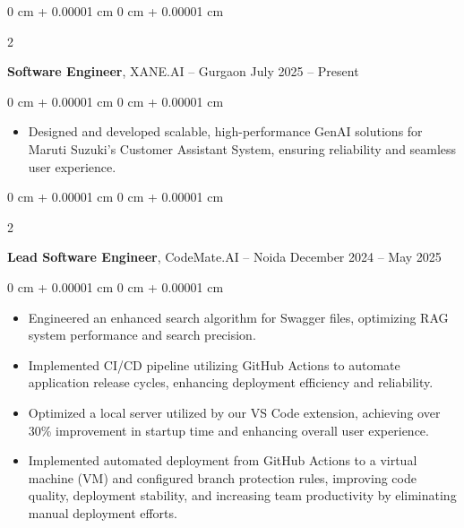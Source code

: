 \documentclass[10pt, letterpaper]{article}
\newenvironment{highlights}{
    \begin{itemize}[
        topsep=0.10 cm,
        parsep=0.10 cm,
        partopsep=0pt,
        itemsep=0pt,
        leftmargin=0 cm + 10pt
    ]
}{
    \end{itemize}
} %
\newenvironment{onecolentry}{
    \begin{adjustwidth}{
        0 cm + 0.00001 cm
    }{
        0 cm + 0.00001 cm
    }
}{
    \end{adjustwidth}
} %
\newenvironment{twocolentry}[2][]{
    \onecolentry
    \def\secondColumn{#2}
    \setcolumnwidth{\fill, 4.5 cm}
    \begin{paracol}{2}
}{
    \switchcolumn \raggedleft \secondColumn
    \end{paracol}
    \endonecolentry
} %
\begin{document}
        \begin{twocolentry}{
            July 2025 – Present
        }
            \textbf{Software Engineer}, XANE.AI -- Gurgaon\end{twocolentry}

        \vspace{0.10 cm}
        \begin{onecolentry}
            \begin{highlights}
                \item Designed and developed scalable, high-performance GenAI solutions for Maruti Suzuki's Customer Assistant System, ensuring reliability and seamless user experience.
            \end{highlights}
        \end{onecolentry}

        
        \begin{twocolentry}{
            December 2024 – May 2025
        }
            \textbf{Lead Software Engineer}, CodeMate.AI -- Noida\end{twocolentry}

        \vspace{0.10 cm}
        \begin{onecolentry}
            \begin{highlights}
                \item Engineered an enhanced search algorithm for Swagger files, optimizing RAG system performance and search precision.
                \item Implemented CI/CD pipeline utilizing GitHub Actions to automate application release cycles, enhancing deployment efficiency and reliability.
                
                \item Optimized a local server utilized by our VS Code extension, achieving over 30\% improvement in startup time and enhancing overall user experience.

                \item Implemented automated deployment from GitHub Actions to a virtual machine (VM) and configured branch protection rules, improving code quality, deployment stability, and increasing team productivity by eliminating manual deployment efforts.
                
            \end{highlights}
        \end{onecolentry}


        \vspace{0.2 cm}
\end{document}
